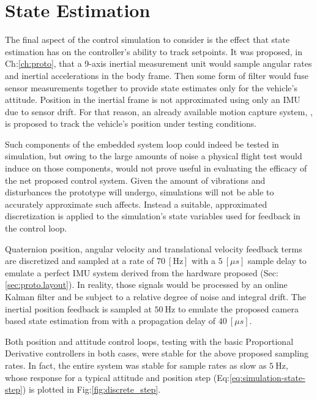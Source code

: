 \section{State Estimation}
\label{sec:simulation.state}
The final aspect of the control simulation to consider is the effect that state estimation has on the controller's ability to track setpoints. It was proposed, in Ch:\ref{ch:proto}, that a 9-axis inertial measurement unit would sample angular rates and inertial accelerations in the body frame. Then some form of filter would fuse sensor measurements together to provide state estimates only for the vehicle's attitude. Position in the inertial frame is not approximated using only an IMU due to sensor drift. For that reason, an already available motion capture system, \cite{arnold}, is proposed to track the vehicle's position under testing conditions. 
\par
Such components of the embedded system loop could indeed be tested in simulation, but owing to the large amounts of noise a physical flight test would induce on those components, would not prove useful in evaluating the efficacy of the net proposed control system. Given the amount of vibrations and disturbances the prototype will undergo, simulations will not be able to accurately approximate such affects. Instead a suitable, approximated discretization is applied to the simulation's state variables used for feedback in the control loop.
\par
Quaternion position, angular velocity and translational velocity feedback terms are discretized and sampled at a rate of $70~[\text{Hz}]$ with a $5~[\mu s]$ sample delay to emulate a perfect IMU system derived from the hardware proposed (Sec:\ref{sec:proto.layout}). In reality, those signals would be processed by an online Kalman filter and be subject to a relative degree of noise and integral drift. The inertial position feedback is sampled at $50~\text{Hz}$ to emulate the proposed camera based state estimation from \cite{arnold} with a propagation delay of $40~[\mu s]$.
\par
Both position and attitude control loops, testing with the basic Proportional Derivative controllers in both cases, were stable for the above proposed sampling rates. In fact, the entire system was stable for sample rates as slow as $5~\text{Hz}$, whose response for a typical attitude and position step (Eq:\ref{eq:simulation-state-step}) is plotted in Fig:\ref{fig:discrete_step}.
\newpage
